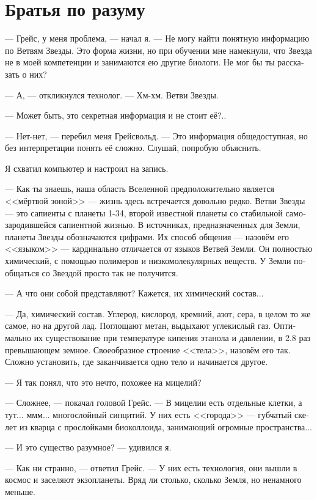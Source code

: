 \documentclass[a4paper,12pt,fleqn]{book}\usepackage{polyglossia}\setdefaultlanguage[babelshorthands=true]{russian}\setotherlanguage{english}\defaultfontfeatures{Ligatures=TeX,Mapping=tex-text}\usepackage{xcolor}\newcommand{\ml}[3]{#2}
\begin{document}
{\section{Братья по разуму}

--- Грейс, у меня проблема, --- начал я.
--- Не могу найти понятную информацию по Ветвям Звезды.
Это форма жизни, но при обучении мне намекнули, что Звезда не в моей компетенции и занимаются ею другие биологи.
Не мог бы ты рассказать о них?

--- А, --- откликнулся технолог.
--- Хм-хм.
Ветви Звезды.

--- Может быть, это секретная информация и не стоит её?..

--- Нет-нет, --- перебил меня Грейсвольд.
--- Это информация общедоступная, но без интерпретации понять её сложно.
Слушай, попробую объяснить.

Я схватил компьютер и настроил на запись.

--- Как ты знаешь, наша область Вселенной предположительно является <<мёртвой зоной>> --- жизнь здесь встречается довольно редко.
Ветви Звезды --- это сапиенты с планеты 1-34, второй известной планеты со стабильной самозародившейся сапиентной жизнью.
В источниках, предназначенных для Земли, планеты Звезды обозначаются цифрами.
Их способ общения --- назовём его <<языком>> --- кардинально отличается от языков Ветвей Земли.
Он полностью химический, с помощью полимеров и низкомолекулярных веществ.
У Земли пообщаться со Звездой просто так не получится.

--- А что они собой представляют?
Кажется, их химический состав...

--- Да, химический состав.
Углерод, кислород, кремний, азот, сера, в целом то же самое, но на другой лад.
Поглощают метан, выдыхают углекислый газ.
Оптимально их существование при температуре кипения этанола и давлении, в 2.8 раз превышающем земное.
Своеобразное строение <<тела>>, назовём его так.
Сложно установить, где заканчивается одно тело и начинается другое.

--- Я так понял, что это нечто, похожее на мицелий?

--- Сложнее, --- покачал головой Грейс.
--- В мицелии есть отдельные клетки, а тут... ммм... многослойный синцитий.
У них есть <<города>> --- губчатый скелет из кварца с прослойками биоколлоида, занимающий огромные пространства...

--- И это существо разумное? --- удивился я.

--- Как ни странно, --- ответил Грейс.
--- У них есть технология, они вышли в космос и заселяют экзопланеты.
Вряд ли столько, сколько Земля, но ненамного меньше.

}
\end{document}
